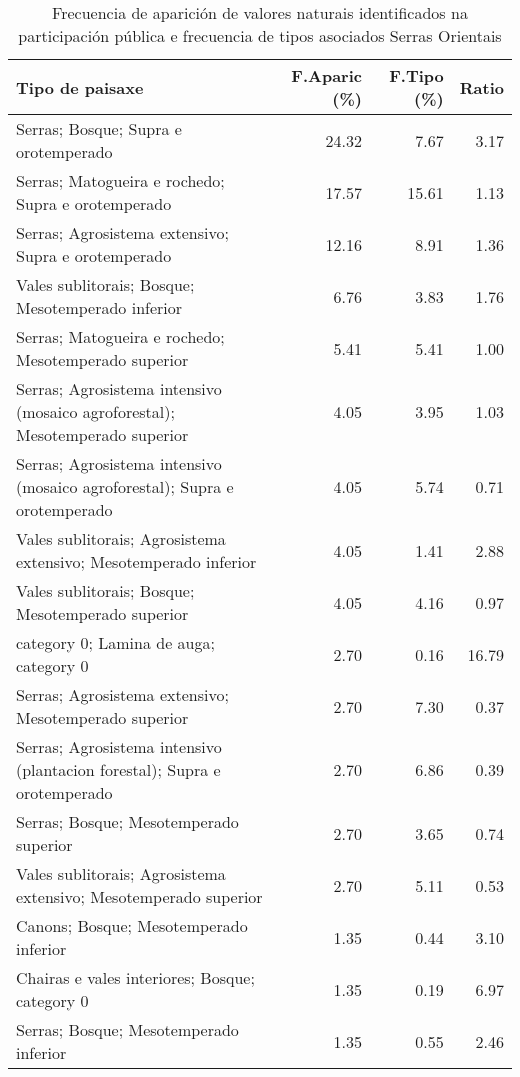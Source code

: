 \begin{table}[p]
\centering
\caption{Frecuencia de aparición de valores naturais identificados na participación pública e frecuencia de tipos asociados Serras Orientais} 
\label{vsixotnat5}
\begin{tabular}{lrrr}
  \hline
Tipo de paisaxe & F.Aparic (\%) & F.Tipo (\%) & Ratio \\ 
  \hline
Serras; Bosque; Supra e orotemperado & 24.32 & 7.67 & 3.17 \\ 
  Serras; Matogueira e rochedo; Supra e orotemperado & 17.57 & 15.61 & 1.13 \\ 
  Serras; Agrosistema extensivo; Supra e orotemperado & 12.16 & 8.91 & 1.36 \\ 
  Vales sublitorais; Bosque; Mesotemperado inferior & 6.76 & 3.83 & 1.76 \\ 
  Serras; Matogueira e rochedo; Mesotemperado superior & 5.41 & 5.41 & 1.00 \\ 
  Serras; Agrosistema intensivo (mosaico agroforestal); Mesotemperado superior & 4.05 & 3.95 & 1.03 \\ 
  Serras; Agrosistema intensivo (mosaico agroforestal); Supra e orotemperado & 4.05 & 5.74 & 0.71 \\ 
  Vales sublitorais; Agrosistema extensivo; Mesotemperado inferior & 4.05 & 1.41 & 2.88 \\ 
  Vales sublitorais; Bosque; Mesotemperado superior & 4.05 & 4.16 & 0.97 \\ 
  category 0; Lamina de auga; category 0 & 2.70 & 0.16 & 16.79 \\ 
  Serras; Agrosistema extensivo; Mesotemperado superior & 2.70 & 7.30 & 0.37 \\ 
  Serras; Agrosistema intensivo (plantacion forestal); Supra e orotemperado & 2.70 & 6.86 & 0.39 \\ 
  Serras; Bosque; Mesotemperado superior & 2.70 & 3.65 & 0.74 \\ 
  Vales sublitorais; Agrosistema extensivo; Mesotemperado superior & 2.70 & 5.11 & 0.53 \\ 
  Canons; Bosque; Mesotemperado inferior & 1.35 & 0.44 & 3.10 \\ 
  Chairas e vales interiores; Bosque; category 0 & 1.35 & 0.19 & 6.97 \\ 
  Serras; Bosque; Mesotemperado inferior & 1.35 & 0.55 & 2.46 \\ 
   \hline
\end{tabular}
\end{table}
